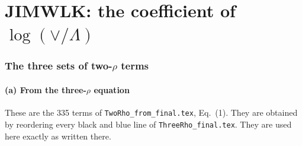 \documentclass[10pt]{article}
\numberwithin{equation}{section}
\begin{document}
\part{JIMWLK: the coefficient of \texorpdfstring{$\log(\vee/\Lambda)$}{log(vee/Lambda)}}
\section{The three sets of two-\texorpdfstring{$\rho$}{rho} terms}\label{sec:sets}
\subsection{(a) From the three-\texorpdfstring{$\rho$}{rho} equation}
These are the 335 terms of \texttt{TwoRho\_from\_final.tex}, Eq.~(1). They are obtained by reordering every black and blue line of \texttt{ThreeRho\_final.tex}. They are used here exactly as written there.
\end{document}
